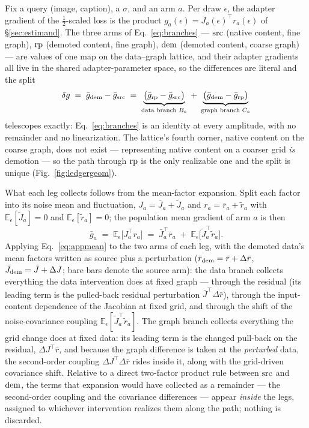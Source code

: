 Fix a query (image, caption), a $\sigma$, and an arm $a$. Per draw
$\epsilon$, the adapter gradient of the $\tfrac12$-scaled loss is the
product $g_a(\epsilon) = J_a(\epsilon)^{\!\top} r_a(\epsilon)$ of
\S\ref{sec:estimand}. The three arms of Eq.~\ref{eq:branches} ---
$\mathrm{src}$ (native content, fine graph), $\mathrm{rp}$ (demoted content, fine
graph), $\mathrm{dem}$ (demoted content, coarse graph) --- are values of one
map on the data--graph lattice, and their adapter gradients all live
in the shared adapter-parameter space, so the differences are literal
and the split
\begin{equation}
\delta g \;=\; \bar g_{\mathrm{dem}} - \bar g_{\mathrm{src}}
\;=\;
\underbrace{\big(\bar g_{\mathrm{rp}} - \bar g_{\mathrm{src}}\big)}_{\text{data
branch }B_e}
\;+\;
\underbrace{\big(\bar g_{\mathrm{dem}} - \bar g_{\mathrm{rp}}\big)}_{\text{graph
branch }C_e}
\label{eq:appbranches}
\end{equation}
telescopes exactly: Eq.~\ref{eq:branches} is an identity at every
amplitude, with no remainder and no linearization. The lattice's
fourth corner, native content on the coarse graph, does not exist ---
representing native content on a coarser grid \emph{is} demotion ---
so the path through $\mathrm{rp}$ is the only realizable one and the split is
unique (Fig.~\ref{fig:ledgergeom}).

What each leg collects follows from the mean-factor expansion. Split
each factor into its noise mean and fluctuation,
$J_a = \bar J_a + \tilde J_a$ and $r_a = \bar r_a + \tilde r_a$ with
$\mathbb{E}_\epsilon[\tilde J_a] = 0$ and
$\mathbb{E}_\epsilon[\tilde r_a] = 0$; the population mean gradient of
arm $a$ is then
\begin{equation}
\bar g_a \;=\; \mathbb{E}_\epsilon\!\big[J_a^{\!\top} r_a\big]
\;=\; \bar J_a^{\!\top} \bar r_a
\;+\; \mathbb{E}_\epsilon\!\big[\tilde J_a^{\!\top} \tilde r_a\big].
\label{eq:appmean}
\end{equation}
Applying Eq.~\ref{eq:appmean} to the two arms of each leg, with the
demoted data's mean factors written as source plus a perturbation
($\bar r_{\mathrm{dem}} = \bar r + \Delta\bar r$,
$\bar J_{\mathrm{dem}} = \bar J + \Delta J$; bare bars denote the source
arm): the data
branch collects everything the data intervention does at fixed
graph --- through the residual (its leading term is the pulled-back
residual perturbation $\bar J^{\!\top}\Delta\bar r$), through
the input-content dependence of the Jacobian at fixed grid, and
through the shift of the noise-covariance coupling
$\mathbb{E}_\epsilon[\tilde J_a^{\!\top}\tilde r_a]$. The graph
branch collects everything the grid change does at fixed data: its
leading term is the changed pull-back on the residual,
$\Delta J^{\!\top}\bar r$, and because the graph difference is taken
at the \emph{perturbed} data, the second-order coupling
$\Delta J^{\!\top}\Delta\bar r$ rides inside it, along with the
grid-driven covariance shift. Relative to a direct two-factor product
rule between $\mathrm{src}$ and $\mathrm{dem}$, the terms that expansion would have
collected as a remainder --- the second-order coupling and the
covariance differences --- appear \emph{inside} the legs, assigned to
whichever intervention realizes them along the path; nothing is
discarded.

